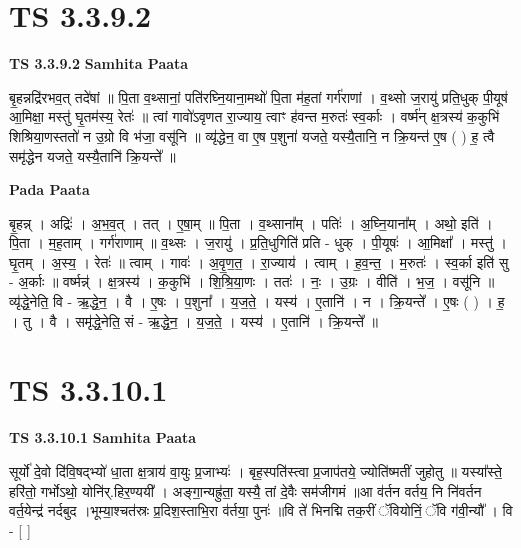 \documentclass[17pt]{extarticle}
\begin{document}

\section{ TS 3.3.9.2 }

\textbf{TS 3.3.9.2 } \newline
\textbf{Samhita Paata} \newline

बृ॒हन्नद्रि॑रभव॒त् तदे॑षां ॥ पि॒ता व॒थ्सानां॒ पति॑रघ्नि॒याना॒मथो॑ पि॒ता म॑ह॒तां गर्ग॑राणां । व॒थ्सो ज॒रायु॑ प्रति॒धुक् पी॒यूष॑ आ॒मिक्षा॒ मस्तु॑ घृ॒तम॑स्य॒ रेतः॑ ॥ त्वां गावो॑ऽवृणत रा॒ज्याय॒ त्वाꣳ ह॑वन्त म॒रुतः॑ स्व॒र्काः । वर्ष्म॑न् क्ष॒त्रस्य॑ क॒कुभि॑ शिश्रिया॒णस्ततो॑ न उ॒ग्रो वि भ॑जा॒ वसू॑नि ॥ व्यृ॑द्धेन॒ वा ए॒ष प॒शुना॑ यजते॒ यस्यै॒तानि॒ न क्रि॒यन्त॑ ए॒ष ( ) ह॒ त्वै समृ॑द्धेन यजते॒ यस्यै॒तानि॑ क्रि॒यन्ते᳚ ॥ \newline

\textbf{Pada Paata} \newline

बृ॒हन्न् । अद्रिः॑ । अ॒भ॒व॒त् । तत् । ए॒षा॒म् ॥ पि॒ता । व॒थ्साना᳚म् । पतिः॑ । अ॒घ्नि॒याना᳚म् । अथो॒ इति॑ । पि॒ता । म॒ह॒ताम् । गर्ग॑राणाम् ॥ व॒थ्सः । ज॒रायु॑ । प्र॒ति॒धुगिति॑ प्रति - धुक् । पी॒यूषः॑ । आ॒मिक्षा᳚ । मस्तु॑ । घृ॒तम् । अ॒स्य॒ । रेतः॑ ॥ त्वाम् । गावः॑ । अ॒वृ॒ण॒त॒ । रा॒ज्याय॑ । त्वाम् । ह॒व॒न्त॒ । म॒रुतः॑ । स्व॒र्का इति॑ सु - अ॒र्काः ॥ वर्ष्मन्न्॑ । क्ष॒त्रस्य॑ । क॒कुभि॑ । शि॒श्रि॒या॒णः । ततः॑ । नः॒ । उ॒ग्रः । वीति॑ । भ॒ज॒ । वसू॑नि ॥ व्यृ॑द्धे॒नेति॒ वि - ऋ॒द्धे॒न॒ । वै । ए॒षः । प॒शुना᳚ । य॒ज॒ते॒ । यस्य॑ । ए॒तानि॑ । न । क्रि॒यन्ते᳚ । ए॒षः ( ) । ह॒ । तु । वै । समृ॑द्धे॒नेति॒ सं - ऋ॒द्धे॒न॒ । य॒ज॒ते॒ । यस्य॑ । ए॒तानि॑ । क्रि॒यन्ते᳚ ॥  \newline





\section{ TS 3.3.10.1 }

\textbf{TS 3.3.10.1 } \newline
\textbf{Samhita Paata} \newline

सूर्यो॑ दे॒वो दि॑वि॒षद्भ्यो॑ धा॒ता क्ष॒त्राय॑ वा॒युः प्र॒जाभ्यः॑ । बृह॒स्पति॑स्त्वा प्र॒जाप॑तये॒ ज्योति॑ष्मतीं जुहोतु ॥ यस्या᳚स्ते॒ हरि॑तो॒ गर्भोऽथो॒ योनि॑र्.हिर॒ण्ययी᳚ । अङ्गा॒न्यह्रु॑ता॒ यस्यै॒ तां दे॒वैः सम॑जीगमं ॥आ व॑र्तन वर्तय॒ नि नि॑वर्तन वर्त॒येन्द्र॑ नर्दबुद ।भूम्या॒श्चत॑स्रः प्र॒दिश॒स्ताभि॒रा व॑र्तया॒ पुनः॑ ॥वि ते॑ भिनद्मि तक॒रीं ॅवियोनिं॒ ॅवि ग॑वी॒न्यौ᳚ । वि - [  ] \newline
\end{document}
